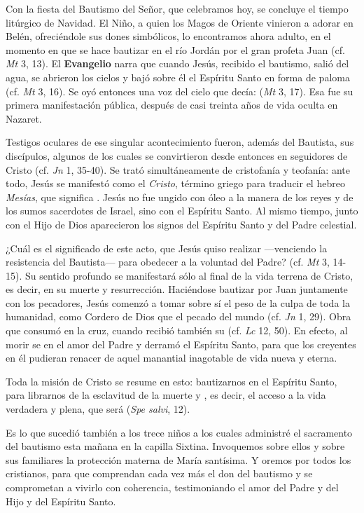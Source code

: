 				
				\begin{body}
					Con la fiesta del Bautismo del Señor, que celebramos hoy, se concluye el tiempo litúrgico de Navidad. El Niño, a quien los Magos de Oriente vinieron a adorar en Belén, ofreciéndole sus dones simbólicos, lo encontramos ahora adulto, en el momento en que se hace bautizar en el río Jordán por el gran profeta Juan (cf. \emph{Mt} 3, 13). El \textbf{Evangelio} narra que cuando Jesús, recibido el bautismo, salió del agua, se abrieron los cielos y bajó sobre él el Espíritu Santo en forma de paloma (cf. \emph{Mt} 3, 16). Se oyó entonces una voz del cielo que decía:  (\emph{Mt} 3, 17). Esa fue su primera manifestación pública, después de casi treinta años de vida oculta en Nazaret.
					
					Testigos oculares de ese singular acontecimiento fueron, además del Bautista, sus discípulos, algunos de los cuales se convirtieron desde entonces en seguidores de Cristo (cf. \emph{Jn} 1, 35-40). Se trató simultáneamente de cristofanía y teofanía: ante todo, Jesús se manifestó como el \emph{Cristo}, término griego para traducir el hebreo \emph{Mesías}, que significa . Jesús no fue ungido con óleo a la manera de los reyes y de los sumos sacerdotes de Israel, sino con el Espíritu Santo. Al mismo tiempo, junto con el Hijo de Dios aparecieron los signos del Espíritu Santo y del Padre celestial.
					
					¿Cuál es el significado de este acto, que Jesús quiso realizar ---venciendo la resistencia del Bautista--- para obedecer a la voluntad del Padre? (cf. \emph{Mt} 3, 14-15). Su sentido profundo se manifestará sólo al final de la vida terrena de Cristo, es decir, en su muerte y resurrección. Haciéndose bautizar por Juan juntamente con los pecadores, Jesús comenzó a tomar sobre sí el peso de la culpa de toda la humanidad, como Cordero de Dios que  el pecado del mundo (cf. \emph{Jn} 1, 29). Obra que consumó en la cruz, cuando recibió también su  (cf. \emph{Lc} 12, 50). En efecto, al morir se  en el amor del Padre y derramó el Espíritu Santo, para que los creyentes en él pudieran renacer de aquel manantial inagotable de vida nueva y eterna.
					
					Toda la misión de Cristo se resume en esto: bautizarnos en el Espíritu Santo, para librarnos de la esclavitud de la muerte y , es decir, el acceso a la vida verdadera y plena, que será  (\emph{Spe salvi}, 12).
					
					Es lo que sucedió también a los trece niños a los cuales administré el sacramento del bautismo esta mañana en la capilla Sixtina. Invoquemos sobre ellos y sobre sus familiares la protección materna de María santísima. Y oremos por todos los cristianos, para que comprendan cada vez más el don del bautismo y se comprometan a vivirlo con coherencia, testimoniando el amor del Padre y del Hijo y del Espíritu Santo.
				\end{body}
			
